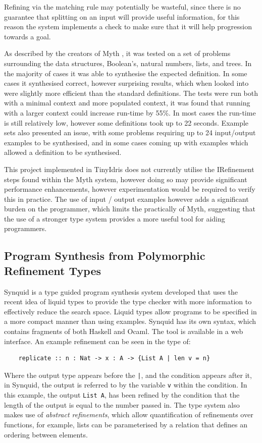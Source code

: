 \documentclass[a4paper]{article}
\begin{document}
Refining via the matching rule may potentially be wasteful, since there is no guarantee that splitting on an input will
provide useful information, for this reason the system implements a check to make sure that 
it will help progression towards a goal. 

As described by the creators of Myth \cite{10.1145/2813885.2738007}, it was tested on a set of problems surrounding the data structures, Boolean's, natural numbers, lists, and trees. In the majority of 
cases it was able to synthesise the expected definition. In some cases it synthesised correct, however surprising results, which 
when looked into were slightly more efficient than the standard definitions. The tests were run both with a minimal context and 
more populated context, it was found that running with a larger context could increase run-time by 55\%. In most cases the run-time 
is still relatively low, however some definitions took up to 22 seconds. Example sets also presented an issue, with some 
problems requiring up to 24 input/output examples to be synthesised, and in some cases coming up with examples which allowed a definition to be synthesised. 

This project implemented in TinyIdris does not currently utilise the IRefinement steps found
within the Myth system, however doing so may provide significant performance
enhancements, however experimentation would be required to verify this
in practice. The use of input / output examples however adds a
significant burden on the programmer, which limits the practically of
Myth, suggesting that the use of a stronger type system provides a
more useful tool for aiding programmers.

\subsection{Program Synthesis from Polymorphic Refinement Types}
\label{sec:org9b52768}
Synquid is a type guided program synthesis system developed that uses the recent idea of liquid types to provide the 
type checker with more information to effectively reduce the search space.
Liquid types allow programs to be specified in a more compact manner than using examples. Synquid has
its own syntax, which contains fragments of both Haskell and Ocaml. The tool is available in a web interface. An example refinement can be seen in the type of:

\begin{center}
  \begin{verbatim}
    replicate :: n : Nat -> x : A -> {List A | len v = n}
  \end{verbatim}
  \end{center}
Where the output type appears before the \texttt{|}, and the condition appears after it, in Synquid, the output is referred to by the variable \texttt{v} within the condition. In this example, the output \texttt{List A}, has been refined by the condition that the length of the output is equal to the number passed in.
The type system also makes use of \emph{abstract refinements}, which allow quantification of refinements over functions, for
example, lists can be parameterised by a relation that defines an ordering between elements. 
\end{document}
